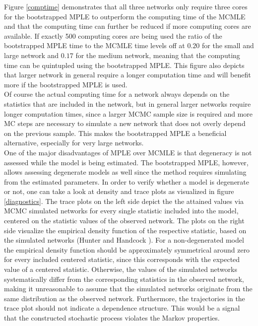 \documentclass[10pt, conference, compsocconf]{IEEEtran}
\begin{document}
Figure \ref{comptime} demonstrates that all three networks only require three cores for the bootstrapped MPLE to outperform the computing time of the MCMLE and that the computing time can further be reduced if more computing cores are available. If exactly 500 computing cores are being used the ratio of the bootstrapped MPLE time to the MCMLE time levels off at $0.20$ for the small and large network and $0.17$ for the medium network, meaning that the computing time can be quintupled using the bootstrapped MPLE. This figure also depicts that larger network in general require a longer computation time and will benefit more if the bootstrapped MPLE is used.\\ 
Of course the actual computing time for a network always depends on the statistics that are included in the network, but in general larger networks require longer computation times, since a larger MCMC sample size is required and more MC steps are necessary to simulate a new network that does not overly depend on the previous sample. This makes the bootstrapped MPLE a beneficial alternative, especially for very large networks. \\
\indent One of the major disadvantages of MPLE over MCMLE is that degeneracy is not assessed while the model is being estimated.  The bootstrapped MPLE, however, allows assessing degenerate models as well since the method requires simulating from the estimated parameters. In order to verify whether a model is degenerate or not, one can take a look at density and trace plots as visualized in figure \ref{diagnostics}. The trace plots on the left side depict the the attained values via MCMC simulated networks for every single statistic included into the model, centered on the statistic values of the observed network. The plots on the right side visualize the empirical density function of the respective statistic, based on the simulated networks (Hunter and Handcock \cite{Hunter.2006}). For a non-degenerated model the empirical density function should be approximately symmetrical around zero for every included centered statistic, since this corresponds with the expected value of a centered statistic. 
Otherwise, the values of the simulated networks systematically differ from the corresponding statistics in the observed network, making it unreasonable to assume that the simulated networks originate from the same distribution as the observed network. Furthermore, the trajectories in the trace plot should not indicate a dependence structure. This would be a signal that the constructed stochastic process violates the Markov properties.
\end{document}
